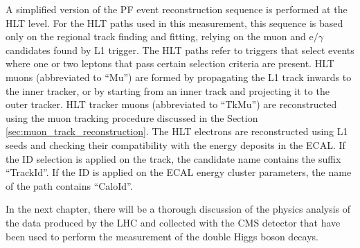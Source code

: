 A simplified version of the PF event reconstruction sequence is performed at the HLT level. 
For the HLT paths used in this measurement, this sequence is based only on the regional track finding and fitting, relying on the muon and e$/\gamma$ candidates found by L1 trigger. The HLT paths refer to triggers that select events where one or two leptons that pass certain selection criteria are present. HLT muons (abbreviated to ``Mu'') are formed by propagating the L1 track inwards to the inner tracker, or by starting from an inner track and projecting it to the outer tracker. HLT tracker muons (abbreviated to ``TkMu'') are reconstructed using the muon tracking procedure discussed in the Section \ref{sec:muon_track_reconstruction}. The HLT electrons are reconstructed using L1 seeds and checking their compatibility with the energy deposits in the ECAL. If the ID selection is applied on the track, the candidate name contains the suffix ``TrackId''. If the ID is applied on the ECAL energy cluster parameters, the name of the path contains ``CaloId''.


In the next chapter, there will be a thorough discussion of the physics analysis of the data produced by the LHC and collected with the CMS detector that have been used to perform the measurement of the double Higgs boson decays.


